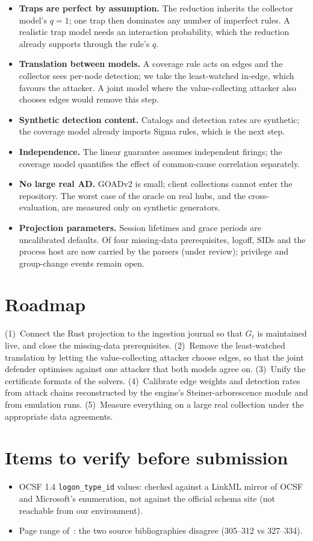 \documentclass[10pt,twocolumn]{article}
\newcommand{\Gt}{G_t}
\begin{document}
\begin{itemize}
\item \textbf{Traps are perfect by assumption.} The reduction inherits the collector model's $q=1$; one
trap then dominates any number of imperfect rules. A realistic trap model needs an
interaction probability, which the reduction already supports through the rule's $q$.
\item \textbf{Translation between models.} A coverage rule acts on edges and the
collector sees per-node detection; we take the least-watched in-edge, which favours the attacker.
A joint model where the value-collecting attacker also chooses edges would remove this step.
\item \textbf{Synthetic detection content.} Catalogs and detection rates are synthetic;
the coverage model already imports Sigma rules, which is the next step.
\item \textbf{Independence.} The linear guarantee assumes independent firings; the coverage model
quantifies the effect of common-cause correlation separately.
\item \textbf{No large real AD.} GOADv2 is small; client collections cannot enter the
repository. The worst case of the oracle on real hubs, and the cross-evaluation, are measured
only on synthetic generators.
\item \textbf{Projection parameters.} Session lifetimes and grace periods are uncalibrated
defaults. Of four missing-data prerequisites, logoff, SIDs and the process host are now carried
by the parsers (under review); privilege and group-change events remain open.
\end{itemize}

\section{Roadmap}

(1)~Connect the Rust projection to the ingestion journal so that $\Gt$ is maintained live, and
close the missing-data prerequisites. (2)~Remove the least-watched translation by letting the
value-collecting attacker choose edges, so that the joint defender optimises against one attacker
that both models agree on. (3)~Unify the certificate formats of the solvers.
(4)~Calibrate edge weights and detection rates from attack chains reconstructed by the engine's
Steiner-arborescence module and from emulation runs. (5)~Measure everything on a large real
collection under the appropriate data agreements.

\section*{Items to verify before submission}
\begin{itemize}
\item OCSF 1.4 \texttt{logon\_type\_id} values: checked against a LinkML mirror of OCSF and
Microsoft's enumeration, not against the official schema site (not reachable from our environment).
\item Page range of~\cite{jain2011double}: the two source bibliographies disagree
(305--312 vs 327--334).
\end{itemize}



\end{document}
